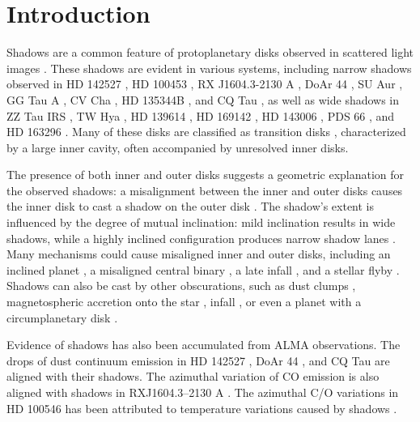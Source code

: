 \documentclass[twocolumn,tighten]{aastex631}
\begin{document}


\section{Introduction} \label{sec:intro}
Shadows are a common feature of protoplanetary disks observed in scattered light images \citep{benisty22}. These shadows are evident in various systems, including narrow shadows observed in HD 142527 \citep{avenhaus17, hunziker21}, HD 100453 \citep{benisty17}, RX J1604.3-2130 A \citep{pinilla15}, DoAr 44 \citep{avenhaus18}, SU Aur \citep{ginski21}, GG Tau A \citep{keppler20}, CV Cha \citep{ginski24}, HD 135344B \citep{stolker16}, and CQ Tau \citep{uyama20, safonov22}, as well as wide shadows in ZZ Tau IRS \citep{hashimoto24}, TW Hya \citep{debes23}, HD 139614 \citep{muro-arena20}, HD 169142 \citep{bertrang18}, HD 143006 \citep{benisty18}, PDS 66 \citep{wolff16}, and HD 163296 \citep{rich19}. Many of these disks are classified as transition disks \citep{vandermarel23}, characterized by a large inner cavity, often accompanied by unresolved inner disks.

The presence of both inner and outer disks suggests a geometric explanation for the observed shadows: a misalignment between the inner and outer disks causes the inner disk to cast a shadow on the outer disk \citep{marino15}. The shadow's extent is influenced by the degree of mutual inclination: mild inclination results in wide shadows, while a highly inclined configuration produces narrow shadow lanes \citep{facchini18}. Many mechanisms could cause misaligned inner and outer disks, including an inclined planet \citep{zhu19, nealon19}, a misaligned central binary \citep{rabago24}, a late infall \citep{kuffmeier21}, and a stellar flyby \citep{nealon20,smallwood24}. Shadows can also be cast by other obscurations, such as dust clumps \citep{rich19}, magnetospheric accretion onto the star \citep{bouvier99}, infall \citep{kuffmeier21, krieger24}, or even a planet with a circumplanetary disk \citep{montesinos21, muley24}.

Evidence of shadows has also been accumulated from ALMA observations. The drops of dust continuum emission in HD 142527 \citep{casassus15}, DoAr 44 \citep{arce-tord23}, and CQ Tau  \citep{ubeira19, safonov22} are aligned with their shadows. The azimuthal variation of CO emission is also aligned with shadows in RXJ1604.3–2130 A \citep{stadler23}. The azimuthal C/O variations in HD 100546 has been attributed to temperature variations caused by shadows \citep{keyte23}.
\end{document}
